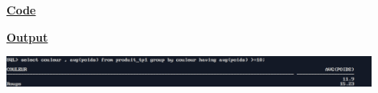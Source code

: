 \newpage
{}

\textbf{\underline{Code}}


\vspace{1cm}
\textbf{\underline{Output}}
\vspace{1cm}
\begin{center}
    \includegraphics[width=0.9\textwidth]{Questions/q32/q32.png}
\end{center}


